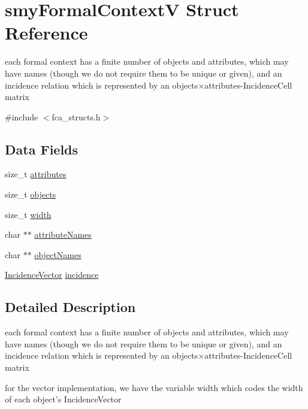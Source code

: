 \hypertarget{structsmyFormalContextV}{\section{smy\-Formal\-Context\-V \-Struct \-Reference}
\label{structsmyFormalContextV}
}


each formal context has a finite number of objects and attributes, which may have names (though we do not require them to be unique or given), and an incidence relation which is represented by an objects×attributes-\/\-Incidence\-Cell matrix  




{\ttfamily \#include $<$fca\-\_\-structs.\-h$>$}

\subsection*{\-Data \-Fields}
\begin{DoxyCompactItemize}
\item 
size\-\_\-t \hyperlink{structsmyFormalContextV_a94d6bf1233ed7e796e71595d53e85265}{attributes}
\item 
size\-\_\-t \hyperlink{structsmyFormalContextV_a6870c7afe6748004c41c81bd5e1c65d2}{objects}
\item 
size\-\_\-t \hyperlink{structsmyFormalContextV_ab4456c63ae1536d8a9afa9a42c30cd10}{width}
\item 
char $\ast$$\ast$ \hyperlink{structsmyFormalContextV_a10705bdd28894f84042e9c1be7f697c6}{attribute\-Names}
\item 
char $\ast$$\ast$ \hyperlink{structsmyFormalContextV_aac85d520aa4849d3dfbe4b1c85c17555}{object\-Names}
\item 
\hyperlink{fca_8h_aae617489ac88fff15979050721fe581f}{\-Incidence\-Vector} \hyperlink{structsmyFormalContextV_a1cc9b0c27ade0450dfe33b04c1f767b8}{incidence}
\end{DoxyCompactItemize}


\subsection{\-Detailed \-Description}
each formal context has a finite number of objects and attributes, which may have names (though we do not require them to be unique or given), and an incidence relation which is represented by an objects×attributes-\/\-Incidence\-Cell matrix 

for the vector implementation, we have the variable width which codes the width of each object's \-Incidence\-Vector 

